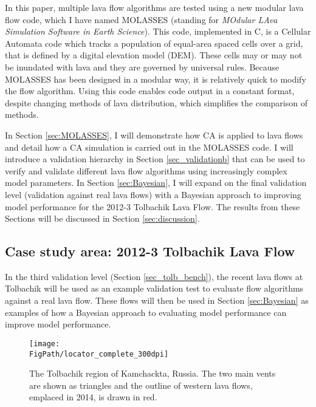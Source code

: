 	In this paper, multiple lava flow algorithms are tested using a new modular lava flow code, which I have named MOLASSES (standing for \textit{MOdular LAva Simulation Software in Earth Science}). This code, implemented in C, is a Cellular Automata code which tracks a population of equal-area spaced cells over a grid, that is defined by a digital elevation model (DEM). These cells may or may not be inundated with lava and they are governed by universal rules. Because MOLASSES has been designed in a modular way, it is relatively quick to modify the flow algorithm. Using this code enables code output in a constant format, despite changing methods of lava distribution, which simplifies the comparison of methods.
	
	In Section \ref{sec:MOLASSES}, I will demonstrate how CA is applied to lava flows and detail how a CA simulation is carried out in the MOLASSES code. I will introduce a validation hierarchy in Section \ref{sec_validationb} that can be used to verify and validate different lava flow algorithms using increasingly complex model parameters. In Section \ref{sec:Bayesian}, I will expand on the final validation level (validation against real lava flows) with a Bayesian approach to improving model performance for the 2012-3 Tolbachik Lava Flow. The results from these Sections will be discussed in Section \ref{sec:discussion}.
	
	\subsection{Case study area: 2012-3 Tolbachik Lava Flow}\label{sec_tolb_back}
	In the third validation level (Section \ref{sec_tolb_bench}), the recent lava flows at Tolbachik will be used as an example validation test to evaluate flow algorithms against a real lava flow. These flows will then be used in Section \ref{sec:Bayesian} as examples of how a Bayesian approach to evaluating model performance can improve model performance. 
	
\begin{figure}[!h]
	\centering
	\texttt{[image: \\FigPath/locator\_complete\_300dpi]}
	\caption[The Tolbachik region of Kamchackta, Russia]{The Tolbachik region of Kamchackta, Russia. The two main vents are shown as triangles and the outline of western lava flows, emplaced in 2014, is drawn in red.}
	\label{fig_locator}
\end{figure}
	

